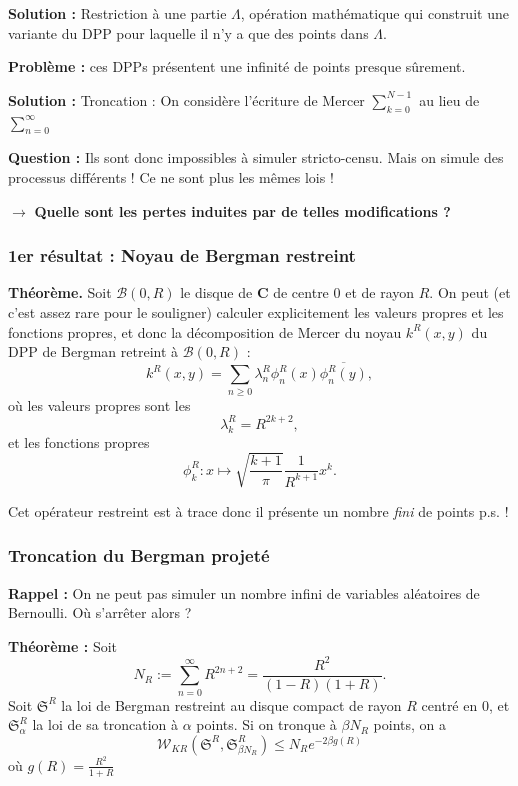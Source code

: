 \documentclass[9pt]{beamer}
\begin{document}
\begin{frame}
    \medskip 

    \textbf{Solution :} Restriction à une partie $ \Lambda $, opération mathématique qui construit une variante du DPP pour laquelle il n'y a que des points dans $ \Lambda $.

    \medskip

    \textbf{Problème :} ces DPPs présentent une infinité de points presque sûrement. 

    \medskip

    \textbf{Solution :} Troncation : On considère l'écriture de Mercer $ \sum_{k=0}^{N-1} $ au lieu de $ \sum_{n=0}^\infty $

    \textbf{Question :} Ils sont donc impossibles à simuler stricto-censu. Mais on simule des processus différents ! Ce ne sont plus les mêmes lois !

    \begin{center} $ \rightarrow $ \textbf{Quelle sont les pertes induites par de telles modifications ?}  \end{center}

\end{frame}\begin{frame}\frametitle{1er résultat : Noyau de Bergman restreint}

    \textbf{Théorème.} Soit $\mathcal{B}(0, R)$ le disque de $ \mathbf C $ de centre $0$ et de rayon $R$. On peut (et c'est assez rare pour le souligner) calculer explicitement les valeurs propres et les fonctions propres, et donc la décomposition de Mercer du noyau $k^R(x,y)$ du DPP de Bergman retreint à $\mathcal{B}(0, R)$ :
    \[
    k^R(x,y) = \sum_{n \ge 0} \lambda_n^R \phi_n^R(x) \overline{\phi_n^R(y)},
    \]
    où les valeurs propres sont les 
    \[
    \lambda_k^R = R^{2k+2},
    \]
    et les fonctions propres
    \[
    \phi_k^R : x \mapsto \sqrt{\frac{k+1}{\pi}} \frac{1}{R^{k+1}} x^k.
    \]

    Cet opérateur restreint est à trace donc il présente un nombre \textit{fini} de points p.s. ! 

\end{frame}\begin{frame}\frametitle{Troncation du Bergman projeté}

    \textbf{Rappel :} On ne peut pas simuler un nombre infini de variables aléatoires de Bernoulli. Où s'arrêter alors ?

    \medskip 

    \textbf{Théorème :} Soit
    \[
    N_R := \sum_{n=0}^\infty R^{2n+2} = \frac{R^2}{(1-R)(1+R)}.
    \]
    Soit $\mathfrak{S}^R$ la loi de Bergman restreint au disque compact de rayon $R$ centré en $0$, et $\mathfrak{S}_\alpha^R$ la loi de sa troncation à $\alpha$ points. Si on tronque à $\beta N_R$ points, on a
    \[
        \mathcal{W}_{KR}(\mathfrak{S}^R, \mathfrak{S}_{\beta N_R}^R) \leqslant N_R e^{-2\beta g(R)}
    \]
    où $ g(R) = \frac{R^2}{1+R} $ 


\end{frame}
\end{document}
